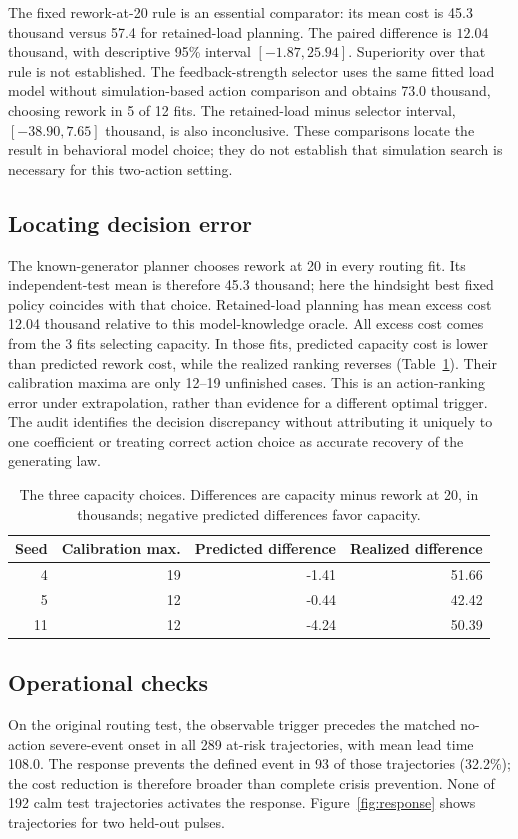The fixed rework-at-20 rule is an essential comparator: its mean cost is 45.3 thousand versus 57.4 for retained-load planning. The paired difference is $12.04$ thousand, with descriptive 95\% interval $[-1.87,25.94]$. Superiority over that rule is not established. The feedback-strength selector uses the same fitted load model without simulation-based action comparison and obtains 73.0 thousand, choosing rework in 5 of 12 fits. The retained-load minus selector interval, $[-38.90,7.65]$ thousand, is also inconclusive. These comparisons locate the result in behavioral model choice; they do not establish that simulation search is necessary for this two-action setting.

\subsection{Locating decision error}
The known-generator planner chooses rework at 20 in every routing fit. Its independent-test mean is therefore 45.3 thousand; here the hindsight best fixed policy coincides with that choice. Retained-load planning has mean excess cost 12.04 thousand relative to this model-knowledge oracle. All excess cost comes from the 3 fits selecting capacity. In those fits, predicted capacity cost is lower than predicted rework cost, while the realized ranking reverses (Table~\ref{tab:choices}). Their calibration maxima are only 12--19 unfinished cases. This is an action-ranking error under extrapolation, rather than evidence for a different optimal trigger. The audit identifies the decision discrepancy without attributing it uniquely to one coefficient or treating correct action choice as accurate recovery of the generating law.
\begin{table}[t]\caption{The three capacity choices. Differences are capacity minus rework at 20, in thousands; negative predicted differences favor capacity.}\label{tab:choices}\centering\small\setlength{\tabcolsep}{3pt}\begin{tabular}{rrrr}\toprule
Seed & Calibration max. & Predicted difference & Realized difference\\\midrule
4 & 19 & -1.41 & 51.66 \\
5 & 12 & -0.44 & 42.42 \\
11 & 12 & -4.24 & 50.39 \\
\bottomrule\end{tabular}\end{table}
\subsection{Operational checks}
On the original routing test, the observable trigger precedes the matched no-action severe-event onset in all 289 at-risk trajectories, with mean lead time 108.0. The response prevents the defined event in 93 of those trajectories (32.2\%); the cost reduction is therefore broader than complete crisis prevention. None of 192 calm test trajectories activates the response. Figure~\ref{fig:response} shows trajectories for two held-out pulses.

